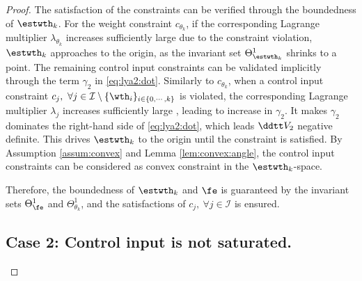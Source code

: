 \documentclass[lettersize,journal]{IEEEtran}
\begin{document}
\begin{proof}
The satisfaction of the constraints can be verified through the boundedness of $\estwth_k$.
For the weight constraint $c_{\theta_k}$, if the corresponding Lagrange multiplier $\lambda_{\theta_k}$ increases sufficiently large  due to the constraint violation, $\estwth_k$ approaches to the origin, as the invariant set $\Theta_{\estwth_k}^{1}$ shrinks to a point.
The remaining control input constraints can be validated implicitly through the term ${\gamma}_2$ in \eqref{eq:lya2:dot}.
Similarly to $c_{\theta_k}$, when a control input constraint $c_j,\ \forall j\in\mathcal{I}\setminus \{\wth_i\}_{i\in\{0,\cdots,k\}}$ is violated, the corresponding Lagrange multiplier $\lambda_j$ increases sufficiently large , leading to increase in ${\gamma}_2$.
It makes ${\gamma}_2$ dominates the right-hand side of \eqref{eq:lya2:dot}, which leads $\ddtt V_2$ negative definite.
This drives $\estwth_k$ to the origin until the constraint is satisfied.
By Assumption \ref{assum:convex} and Lemma \ref{lem:convex:angle}, the control input constraints can be considered as convex constraint in the $\estwth_k$-space.

Therefore, the boundedness of $\estwth_k$ and $\fe$ is guaranteed by the invariant sets $\Theta_{\fe}^{1}$ and $\Theta_{\theta_k}^{1}$, and the satisfactions of $c_j,\ \forall j\in\mathcal{I}$ is ensured.

\subsection*{Case 2: Control input is not saturated.}


\end{proof}
\end{document}

